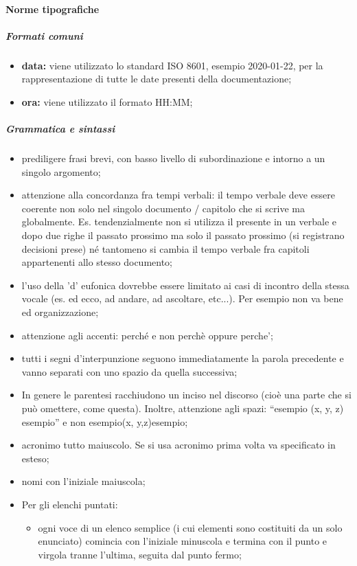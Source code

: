 			\paragraph{Norme tipografiche}
				\subparagraph{Formati comuni}
					\begin{itemize}
						\item \textbf{data:} viene utilizzato lo standard ISO 8601, esempio 2020-01-22, per la rappresentazione di tutte le date presenti della documentazione;
						\item \textbf{ora:} viene utilizzato il formato HH:MM;
					\end{itemize}
				\subparagraph{Grammatica e sintassi}
					\begin{itemize}
						\item prediligere frasi brevi, con basso livello di subordinazione e intorno a un singolo argomento;
						\item attenzione alla concordanza fra tempi verbali: il tempo verbale deve essere coerente non solo nel singolo documento / capitolo che si scrive ma globalmente. Es. tendenzialmente non si utilizza il presente in un 								verbale e dopo due righe il passato prossimo ma solo il passato prossimo (si registrano decisioni prese) né tantomeno si cambia il tempo verbale fra capitoli appartenenti allo stesso documento;
						\item l'uso della 'd' eufonica dovrebbe essere limitato ai casi di incontro della stessa vocale (es. ed ecco, ad andare, ad ascoltare, etc...). Per esempio non va bene ed organizzazione;
						\item attenzione agli accenti: perché 	e non perchè oppure perche';
						\item tutti i segni d’interpunzione seguono immediatamente la parola precedente e vanno separati con uno spazio da quella successiva;
						\item In genere le parentesi racchiudono un inciso nel discorso (cioè una parte che si può omettere, come questa). Inoltre, attenzione agli spazi: “esempio (x, y, z) esempio” e non esempio(x,  y,z)esempio;
						\item acronimo tutto maiuscolo. Se si usa acronimo prima volta va specificato in esteso;
						\item nomi con l'iniziale maiuscola;
						\item Per gli elenchi puntati:
							\begin{itemize}
								\item ogni voce di un elenco semplice (i cui elementi sono costituiti da un solo enunciato) comincia con l’iniziale minuscola e termina con il punto e virgola tranne l’ultima, seguita dal punto fermo;

\end{itemize}
\end{itemize}
